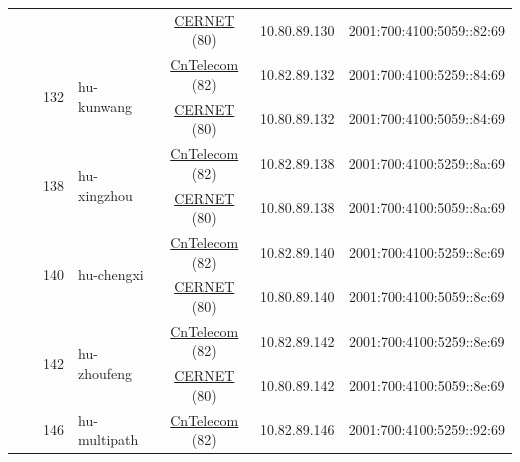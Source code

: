 \begin{small}
\begin{center}
\begin{longtable}{|c|c|c|c|c|c|c|c|}
  &  &  &  & \multicolumn{2}{|c|}{\tiny{\href{http://www.cernet.edu.cn}{CERNET} (80)}} & \tiny{10.80.89.130} & \tiny{2001:700:4100:5059::82:69} \\* \cline{3-3}\cline{4-4}\cline{5-5}\cline{6-6}\cline{7-7}\cline{8-8}
  &  & \multirow{2}{*}{\tiny{132}} & \multicolumn{1}{|l|}{\multirow{2}{*}{\tiny{hu-kunwang}}} & \multicolumn{2}{|c|}{\tiny{\href{http://www.chinatelecom.com.cn}{CnTelecom} (82)}} & \tiny{10.82.89.132} & \tiny{2001:700:4100:5259::84:69} \\* \cline{5-5}\cline{6-6}\cline{7-7}\cline{8-8}
  &  &  &  & \multicolumn{2}{|c|}{\tiny{\href{http://www.cernet.edu.cn}{CERNET} (80)}} & \tiny{10.80.89.132} & \tiny{2001:700:4100:5059::84:69} \\* \cline{3-3}\cline{4-4}\cline{5-5}\cline{6-6}\cline{7-7}\cline{8-8}
  &  & \multirow{2}{*}{\tiny{138}} & \multicolumn{1}{|l|}{\multirow{2}{*}{\tiny{hu-xingzhou}}} & \multicolumn{2}{|c|}{\tiny{\href{http://www.chinatelecom.com.cn}{CnTelecom} (82)}} & \tiny{10.82.89.138} & \tiny{2001:700:4100:5259::8a:69} \\* \cline{5-5}\cline{6-6}\cline{7-7}\cline{8-8}
  &  &  &  & \multicolumn{2}{|c|}{\tiny{\href{http://www.cernet.edu.cn}{CERNET} (80)}} & \tiny{10.80.89.138} & \tiny{2001:700:4100:5059::8a:69} \\* \cline{3-3}\cline{4-4}\cline{5-5}\cline{6-6}\cline{7-7}\cline{8-8}
  &  & \multirow{2}{*}{\tiny{140}} & \multicolumn{1}{|l|}{\multirow{2}{*}{\tiny{hu-chengxi}}} & \multicolumn{2}{|c|}{\tiny{\href{http://www.chinatelecom.com.cn}{CnTelecom} (82)}} & \tiny{10.82.89.140} & \tiny{2001:700:4100:5259::8c:69} \\* \cline{5-5}\cline{6-6}\cline{7-7}\cline{8-8}
  &  &  &  & \multicolumn{2}{|c|}{\tiny{\href{http://www.cernet.edu.cn}{CERNET} (80)}} & \tiny{10.80.89.140} & \tiny{2001:700:4100:5059::8c:69} \\* \cline{3-3}\cline{4-4}\cline{5-5}\cline{6-6}\cline{7-7}\cline{8-8}
  &  & \multirow{2}{*}{\tiny{142}} & \multicolumn{1}{|l|}{\multirow{2}{*}{\tiny{hu-zhoufeng}}} & \multicolumn{2}{|c|}{\tiny{\href{http://www.chinatelecom.com.cn}{CnTelecom} (82)}} & \tiny{10.82.89.142} & \tiny{2001:700:4100:5259::8e:69} \\* \cline{5-5}\cline{6-6}\cline{7-7}\cline{8-8}
  &  &  &  & \multicolumn{2}{|c|}{\tiny{\href{http://www.cernet.edu.cn}{CERNET} (80)}} & \tiny{10.80.89.142} & \tiny{2001:700:4100:5059::8e:69} \\* \cline{3-3}\cline{4-4}\cline{5-5}\cline{6-6}\cline{7-7}\cline{8-8}
  &  & \multirow{2}{*}{\tiny{146}} & \multicolumn{1}{|l|}{\multirow{2}{*}{\tiny{hu-multipath}}} & \multicolumn{2}{|c|}{\tiny{\href{http://www.chinatelecom.com.cn}{CnTelecom} (82)}} & \tiny{10.82.89.146} & \tiny{2001:700:4100:5259::92:69} \\* \cline{5-5}\cline{6-6}\cline{7-7}\cline{8-8}

\end{longtable}
\end{center}
\end{small}
